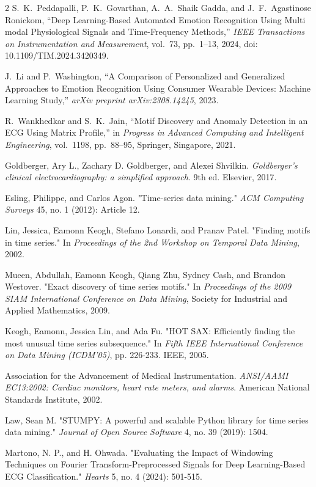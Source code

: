 \documentclass[conference,10pt]{IEEEtran}
\begin{document}
\begin{thebibliography}{2}
 S.~K.~Peddapalli, P.~K.~Govarthan, A.~A.~Shaik Gadda, and J.~F.~Agastinose Ronickom, ``Deep Learning-Based Automated Emotion Recognition Using Multi modal Physiological Signals and Time-Frequency Methods,'' \emph{IEEE Transactions on Instrumentation and Measurement}, vol.~73, pp.~1--13, 2024, doi: 10.1109/TIM.2024.3420349.

 J.~Li and P.~Washington, ``A Comparison of Personalized and Generalized Approaches to Emotion Recognition Using Consumer Wearable Devices: Machine Learning Study,'' \emph{arXiv preprint arXiv:2308.14245}, 2023.

 R.~Wankhedkar and S.~K.~Jain, ``Motif Discovery and Anomaly Detection in an ECG Using Matrix Profile,'' in \emph{Progress in Advanced Computing and Intelligent Engineering}, vol.~1198, pp.~88--95, Springer, Singapore, 2021.

 Goldberger, Ary L., Zachary D. Goldberger, and Alexei Shvilkin. \textit{Goldberger's clinical electrocardiography: a simplified approach}. 9th ed. Elsevier, 2017.


 Esling, Philippe, and Carlos Agon. "Time-series data mining." \textit{ACM Computing Surveys} 45, no. 1 (2012): Article 12.


 Lin, Jessica, Eamonn Keogh, Stefano Lonardi, and Pranav Patel. "Finding motifs in time series." In \textit{Proceedings of the 2nd Workshop on Temporal Data Mining}, 2002.

 Mueen, Abdullah, Eamonn Keogh, Qiang Zhu, Sydney Cash, and Brandon Westover. "Exact discovery of time series motifs." In \textit{Proceedings of the 2009 SIAM International Conference on Data Mining}, 
Society for Industrial and Applied Mathematics, 2009.

 Keogh, Eamonn, Jessica Lin, and Ada Fu. "HOT SAX: Efficiently finding the most unusual time series subsequence." In \textit{Fifth IEEE International Conference on Data Mining (ICDM'05)}, pp. 226-233. IEEE, 2005.


 Association for the Advancement of Medical Instrumentation. \textit{ANSI/AAMI EC13:2002: Cardiac monitors, heart rate meters, and alarms}. American National Standards Institute, 2002.

 Law, Sean M. "STUMPY: A powerful and scalable Python library for time series data mining." \textit{Journal of Open Source Software} 4, no. 39 (2019): 1504.

 Martono, N. P., and H. Ohwada. "Evaluating the Impact of Windowing Techniques on Fourier Transform-Preprocessed Signals for Deep Learning-Based ECG Classification." \textit{Hearts} 5, no. 4 (2024): 501-515.


\end{thebibliography}
\end{document}

